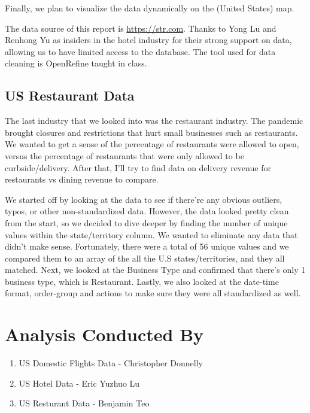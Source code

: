 \documentclass[sigconf, nonacm]{acmart}
\begin{document}
Finally, we plan to visualize the data dynamically on the (United States) map.

The data source of this report is \url{https://str.com}. Thanks to Yong Lu and Renhong Yu as insiders in the hotel industry for their strong support on data, allowing us to have limited access to the database. The tool used for data cleaning is OpenRefine taught in class.

\subsection{US Restaurant Data}
The last industry that we looked into was the restaurant industry. The pandemic brought closures and restrictions that hurt small businesses such as restaurants. We wanted to get a sense of the percentage of restaurants were allowed to open, versus the percentage of restaurants that were only allowed to be curbside/delivery. After that, I’ll try to find data on delivery revenue for restaurants vs dining revenue to compare. 

We started off by looking at the data to see if there’re any obvious outliers, typos, or other non-standardized data. However, the data looked pretty clean from the start, so we decided to dive deeper by finding the number of unique values within the state/territory column. We wanted to eliminate any data that didn't make sense. Fortunately, there were a total of 56 unique values and we compared them to an array of the all the U.S states/territories, and they all matched. Next, we looked at the Business Type and confirmed that there’s only 1 business type, which is Restaurant. Lastly, we also looked at the date-time format, order-group and actions to make sure they were all standardized as well.

\section{Analysis Conducted By}
\begin{enumerate}
  \item  US Domestic Flights Data - Christopher Donnelly 
  \item US Hotel Data - Eric Yuzhuo Lu
  \item US Resturant Data - Benjamin Teo
\end{enumerate}
\end{document}
